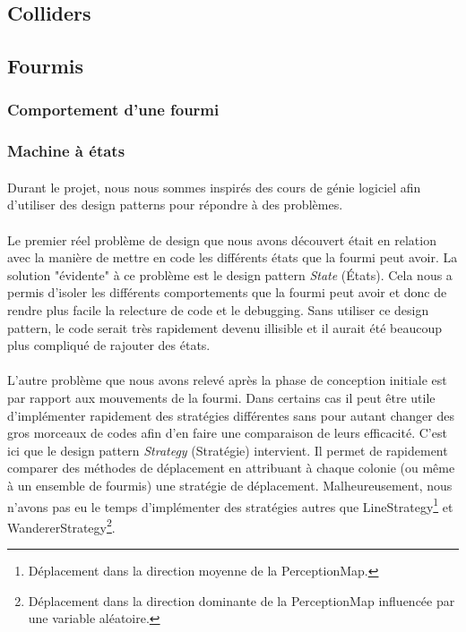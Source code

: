 \documentclass{EPUProjetDi}
\begin{document}
\subsection{Colliders}

\subsection{Fourmis}

\subsubsection{Comportement d'une fourmi}

\subsubsection{Machine à états}

\paragraph{}
Durant le projet, nous nous sommes inspirés des cours de génie logiciel afin d'utiliser des design patterns pour répondre à des problèmes.

\paragraph{}
Le premier réel problème de design que nous avons découvert était en relation avec la manière de mettre en code les différents états que la fourmi peut avoir.
La solution "évidente" à ce problème est le design pattern \textit{State} (États).
Cela nous a permis d'isoler les différents comportements que la fourmi peut avoir et donc de rendre plus facile la relecture de code et le debugging.
Sans utiliser ce design pattern, le code serait très rapidement devenu illisible et il aurait été beaucoup plus compliqué de rajouter des états.

\paragraph{}
L'autre problème que nous avons relevé après la phase de conception initiale est par rapport aux mouvements de la fourmi. 
Dans certains cas il peut être utile d'implémenter rapidement des stratégies différentes sans pour autant changer des gros morceaux de codes afin d'en faire une comparaison de leurs efficacité.
C'est ici que le design pattern \textit{Strategy} (Stratégie) intervient. Il permet de rapidement comparer des méthodes de déplacement en attribuant à chaque colonie (ou même à un ensemble de fourmis) une
stratégie de déplacement.
Malheureusement, nous n'avons pas eu le temps d'implémenter des stratégies autres que LineStrategy\footnote{Déplacement dans la direction moyenne de la PerceptionMap.} 
et WandererStrategy\footnote{Déplacement dans la direction dominante de la PerceptionMap influencée par une variable aléatoire.}.
\end{document}
